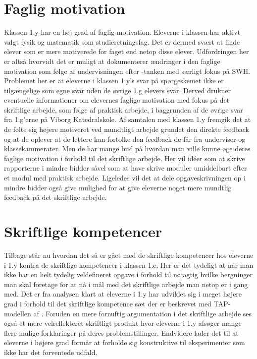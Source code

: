 \section{Faglig motivation}
\label{sec:faglig}
Klassen 1.y har en høj grad af faglig motivation. Eleverne i klassen har aktivt valgt fysik og matematik som studieretningsfag. Det er dermed svært at finde elever som er mere motiverede for faget end netop disse elever. Udfordringen her er altså hvorvidt det er muligt at dokumenterer ændringer i den faglige motivation som følge af undervisningen efter \ib-tanken med særligt fokus på SWH. Problemet her er at eleverne i klassen 1.y's svar på spørgeskemet ikke er tilgængelige som egne svar uden de øvrige 1.g elevers svar. Derved drukner eventuelle informationer om elevernes faglige motivation med fokus på det skriftlige arbejde, som følge af praktisk arbejde, i baggrunden af de øvrige svar fra 1.g'erne på Viborg Katedralskole.
Af samtalen med klassen 1.y fremgik det at de følte sig højere motiveret ved mundtligt arbejde grundet den direkte feedback og at de oplever at de lettere kan fortolke den feedback de får fra underviser og klassekammerater. Men de har mange bud på hvordan man ville kunne øge deres faglige motivation i forhold til det skriftlige arbejde. Her vil idéer som at skrive rapporterne i mindre bidder såvel som at have skrive moduler umiddelbart efter et modul med praktisk arbejde. Ligeledes vil det at dele opgaveskrivningen op i mindre bidder også give mulighed for at give eleverne noget mere mundtlig feedback på det skriftlige arbejde. 

\section{Skriftlige kompetencer}
\label{sec:skr}
Tilbage står nu hvordan det så er gået med de skriftlige kompetencer hos eleverne i 1.y kontra de skriftlige kompetencer i klassen 1.e. Her er det tydeligt at når man ikke har en helt tydelig veldefineret opgave i forhold til nøjagtig hvilke bergninger man skal foretage for at nå i mål med det skriftlige arbejde man netop er i gang med. Det er fra analysen klart at eleverne i 1.y har udviklet sig i meget højere grad i forhold til det skriftlige kompetence sæt der er beskrevet med TAP-modellen af \citet{Erduran2004}. Foruden en mere fornuftig argumentation i det skriftlige arbejde ses også et mere velreflekteret skriftligt produkt hvor eleverne i 1.y afsøger mange flere mulige forklaringer på deres problemstillinger. Endvidere lader det til at eleverne i højere grad formår at forholde sig konstruktive til eksperimenter som ikke har det forventede udfald. 